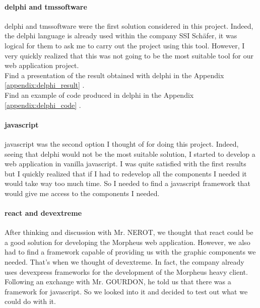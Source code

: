 \documentclass[a4paper, 12pt, french]{article}
\begin{document}
						\paragraph{\gls{delphi} and \gls{tmssoftware}\\}
							\gls{delphi} and \gls{tmssoftware} were the first solution considered in this project. Indeed, the \gls{delphi} language is already used within the company SSI Schäfer, it was logical for them to ask me to carry out the project using this tool. However, I very quickly realized that this was not going to be the most suitable tool for our web application project.\\

								\noindent Find a presentation of the result obtained with \gls{delphi}
								 in the Appendix \ref{appendix:delphi_result} .\\
								\noindent Find an example of code produced in \gls{delphi} in the Appendix \ref{appendix:delphi_code} .
											
						\paragraph{\gls{javascript}\\}
							\gls{javascript} was the second option I thought of for doing this project. Indeed, seeing that \gls{delphi} would not be the most suitable solution, I started to develop a web application in vanilla \gls{javascript}. I was quite satisfied with the first results but I quickly realized that if I had to redevelop all the components I needed it would take way too much time. So I needed to find a \gls{javascript} \gls{framework} that would give me access to the components I needed.
					
						\paragraph{\gls{react} and \gls{devextreme}\\}
							After thinking and discussion with Mr. NEROT, we thought that \gls{react} could be a good solution for developing the Morpheus web application. However, we also had to find a \gls{framework} capable of providing us with the graphic components we needed. That's when we thought of \gls{devextreme}. In fact, the company already uses \gls{devexpress} \glspl{framework} for the development of the Morpheus heavy client. Following an exchange with Mr. GOURDON, he told us that there was a \gls{framework} for \gls{javascript}. So we looked into it and decided to test out what we could do with it.\\		
					
\end{document}
